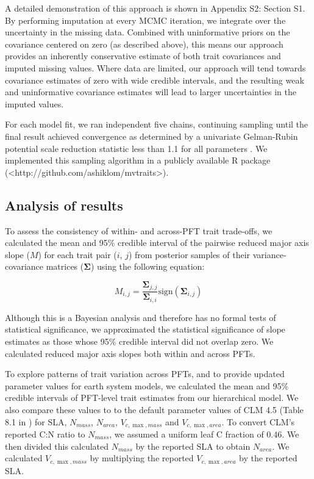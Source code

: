 \documentclass{article}
\begin{document}
A detailed demonstration of this approach is shown in Appendix S2: Section S1.
By performing imputation at every MCMC iteration, we integrate over the uncertainty in the missing data.
Combined with uninformative priors on the covariance centered on zero (as described above),
this means our approach provides an inherently conservative estimate of both trait covariances and imputed missing values.
Where data are limited, our approach will tend towards covariance estimates of zero with wide credible intervals,
and the resulting weak and uninformative covariance estimates will lead to larger uncertainties in the imputed values.

For each model fit, we ran independent five chains, continuing sampling until the final result achieved convergence as determined by a univariate Gelman-Rubin potential scale reduction statistic less than 1.1 for all parameters \citep{gelman_1992_inference}.
We implemented this sampling algorithm in a publicly available R \citep{team_2018_r} package (<http://github.com/ashiklom/mvtraits>).

\subsection{Analysis of results}

To assess the consistency of within- and across-PFT trait trade-offs,
we calculated the mean and 95\% credible interval of the pairwise reduced major axis slope ($M$) for each trait pair ($i$, $j$)
from posterior samples of their variance-covariance matrices ($\mathbf{\Sigma}$) using the following equation:

\begin{equation}
M_{i,j} = \frac{\mathbf{\Sigma}_{j,j}}{\mathbf{\Sigma}_{i,i}} \textrm{sign}(\mathbf{\Sigma}_{i,j})
\end{equation}

Although this is a Bayesian analysis and therefore has no formal tests of statistical significance,
we approximated the statistical significance of slope estimates as those whose 95\% credible interval did not overlap zero.
We calculated reduced major axis slopes both within and across PFTs.

To explore patterns of trait variation across PFTs,
and to provide updated parameter values for earth system models,
we calculated the mean and 95\% credible intervals of PFT-level trait estimates from our hierarchical model.
We also compare these values to to the default parameter values of CLM 4.5 (Table 8.1 in \citealt{clm45_note}) for SLA, $N_{mass}$, $N_{area}$, $V_{c,\max,mass}$ and $V_{c,\max,area}$.
To convert CLM's reported C:N ratio to $N_{mass}$, we assumed a uniform leaf C fraction of 0.46.
We then divided this calculated $N_{mass}$ by the reported SLA to obtain $N_{area}$.
We calculated $V_{c,\max,mass}$ by multiplying the reported $V_{c,\max,area}$ by the reported SLA.
\end{document}
